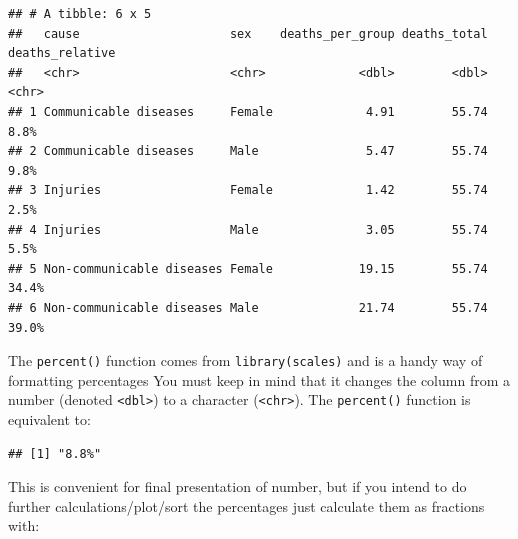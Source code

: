 \documentclass[
  12pt,
  krantz2]{krantz}
\makeatletter
\newenvironment{Shaded}{\begin{snugshade}}{\end{snugshade}}
\newcommand{\CommentTok}[1]{\textcolor[rgb]{0.56,0.35,0.01}{\textit{#1}}}
\newcommand{\DataTypeTok}[1]{\textcolor[rgb]{0.13,0.29,0.53}{#1}}
\newcommand{\DecValTok}[1]{\textcolor[rgb]{0.00,0.00,0.81}{#1}}
\newcommand{\FloatTok}[1]{\textcolor[rgb]{0.00,0.00,0.81}{#1}}
\newcommand{\KeywordTok}[1]{\textcolor[rgb]{0.13,0.29,0.53}{\textbf{#1}}}
\newcommand{\NormalTok}[1]{#1}
\newcommand{\OperatorTok}[1]{\textcolor[rgb]{0.81,0.36,0.00}{\textbf{#1}}}
\newcommand{\StringTok}[1]{\textcolor[rgb]{0.31,0.60,0.02}{#1}}
\newenvironment{kframe}{%
\medskip{}
\setlength{\fboxsep}{.8em}
 \def\at@end@of@kframe{}%
 \ifinner\ifhmode%
  \def\at@end@of@kframe{\end{minipage}}%
  \begin{minipage}{\columnwidth}%
 \fi\fi%
 \def\FrameCommand##1{\hskip\@totalleftmargin \hskip-\fboxsep
 \colorbox{shadecolor}{##1}\hskip-\fboxsep
     \hskip-\linewidth \hskip-\@totalleftmargin \hskip\columnwidth}%
 \MakeFramed {\advance\hsize-\width
   \@totalleftmargin\z@ \linewidth\hsize
   \@setminipage}}%
 {\par\unskip\endMakeFramed%
 \at@end@of@kframe}
\renewenvironment{Shaded}{\begin{kframe}}{\end{kframe}}
\makeatother
\begin{document}
\begin{verbatim}
## # A tibble: 6 x 5
##   cause                     sex    deaths_per_group deaths_total deaths_relative
##   <chr>                     <chr>             <dbl>        <dbl> <chr>          
## 1 Communicable diseases     Female             4.91        55.74 8.8%           
## 2 Communicable diseases     Male               5.47        55.74 9.8%           
## 3 Injuries                  Female             1.42        55.74 2.5%           
## 4 Injuries                  Male               3.05        55.74 5.5%           
## 5 Non-communicable diseases Female            19.15        55.74 34.4%          
## 6 Non-communicable diseases Male              21.74        55.74 39.0%
\end{verbatim}

The \texttt{percent()} function comes from \texttt{library(scales)} and is a handy way of formatting percentages
You must keep in mind that it changes the column from a number (denoted \texttt{\textless{}dbl\textgreater{}}) to a character (\texttt{\textless{}chr\textgreater{}}).
The \texttt{percent()} function is equivalent to:

\begin{Shaded}
\end{Shaded}

\begin{verbatim}
## [1] "8.8%"
\end{verbatim}

This is convenient for final presentation of number, but if you intend to do further calculations/plot/sort the percentages just calculate them as fractions with:

\begin{Shaded}
\end{Shaded}
\end{document}
